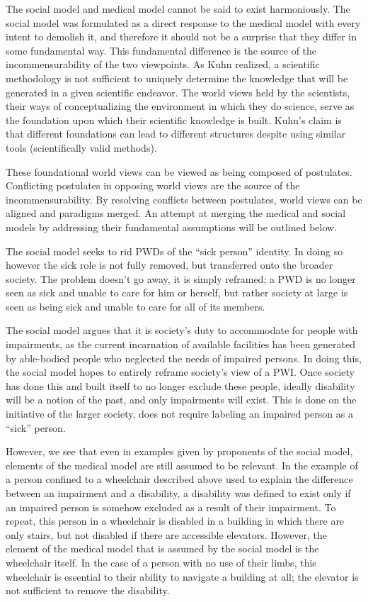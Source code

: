 \documentclass[a4paper]{article}
\begin{document}
The social model and medical model cannot be said to exist harmoniously. The
social model was formulated as a direct response to the medical model with
every intent to demolish it, and therefore it should not be a surprise that
they differ in some fundamental way. This fundamental difference is the source
of the incommensurability of the two viewpoints. As Kuhn realized, a
scientific methodology is not sufficient to uniquely determine the knowledge
that will be generated in a given scientific endeavor. The world views held by
the scientists, their ways of conceptualizing the environment in which they do
science, serve as the foundation upon which their scientific knowledge is
built. Kuhn's claim is that different foundations can lead to different
structures despite using similar tools (scientifically valid methods).

These foundational world views can be viewed as being composed of postulates.
Conflicting postulates in opposing world views are the source of the
incommensurability. By resolving conflicts between postulates, world views can
be aligned and paradigms merged. An attempt at merging the medical and social
models by addressing their fundamental assumptions will be outlined below.

The social model seeks to rid PWDs of the ``sick person'' identity. In doing
so however the sick role is not fully removed, but transferred onto the
broader society. The problem doesn’t go away, it is simply reframed; a PWD is
no longer seen as sick and unable to care for him or herself, but rather
society at large is seen as being sick and unable to care for all of its
members.

The social model argues that it is society's duty to accommodate for people
with impairments, as the current incarnation of available facilities has been
generated by able-bodied people who neglected the needs of impaired persons.
In doing this, the social model hopes to entirely reframe society's view of a
PWI. Once society has done this and built itself to no longer exclude these
people, ideally disability will be a notion of the past, and only impairments
will exist. This is done on the initiative of the larger society, does not
require labeling an impaired person as a ``sick'' person.

However, we see that even in examples given by proponents of the social model,
elements of the medical model are still assumed to be relevant.  In the
example of a person confined to a wheelchair described above used to explain
the difference between an impairment and a disability, a disability was
defined to exist only if an impaired person is somehow excluded as a result of
their impairment. To repeat, this person in a wheelchair is disabled in a
building in which there are only stairs, but not disabled if there are
accessible elevators. However, the element of the medical model that is
assumed by the social model is the wheelchair itself. In the case of a person
with no use of their limbs, this wheelchair is essential to their ability
to navigate a building at all; the elevator is not sufficient to remove the
disability. 
\end{document}
